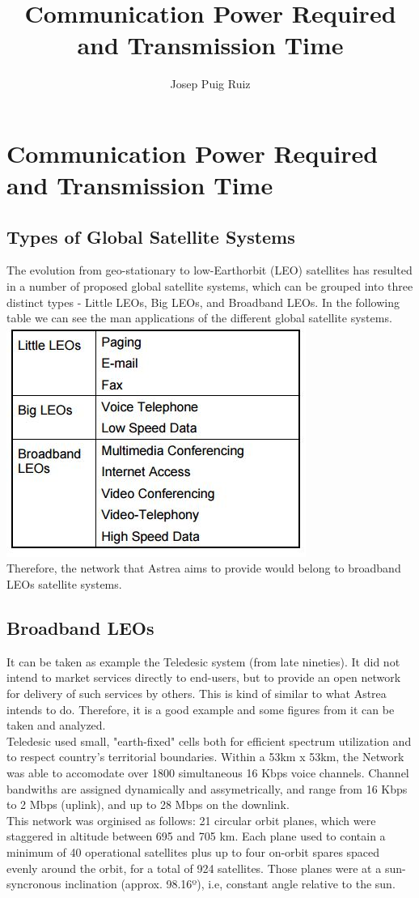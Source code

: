 \documentclass[12pt,a4paper]{report}
\author{Josep Puig Ruiz}
\title{Communication Power Required and Transmission Time}
\begin{document}
\maketitle
\chapter{Communication Power Required and Transmission Time}
\section{Types of Global Satellite Systems}
The evolution from geo-stationary to low-Earthorbit (LEO) satellites has resulted in a number of proposed global satellite systems, which can be grouped into three distinct types - Little LEOs, Big LEOs, and Broadband LEOs. 
In the following table we can see the man applications of the different global satellite systems.\\
\includegraphics[scale=1]{Types.jpg}  \\
Therefore, the network that Astrea aims to provide would belong to broadband LEOs satellite systems. 
\section{Broadband LEOs}
It can be taken as example the Teledesic system (from late nineties). It did not intend to market services directly to end-users, but to provide an open network for delivery of such services by others. This is kind of similar to what Astrea intends to do. Therefore, it is a good example and some figures from it can be taken and analyzed. \\
Teledesic used small, "earth-fixed" cells both for efficient spectrum utilization and to respect country's territorial boundaries. Within a 53km x 53km, the Network was able to accomodate over 1800 simultaneous 16 Kbps voice channels. Channel bandwiths are assigned dynamically and assymetrically, and range from 16 Kbps to 2 Mbps (uplink), and up to 28 Mbps on the downlink. \\
This network was orginised as follows: 21 circular orbit planes, which were staggered in altitude between 695 and 705 km. Each plane used to contain a minimum of 40 operational satellites plus up to four on-orbit spares spaced evenly around the orbit, for a total of 924 satellites. Those planes were at a sun-syncronous inclination (approx. 98.16º), i.e, constant angle relative to the sun. \\
\end{document}
